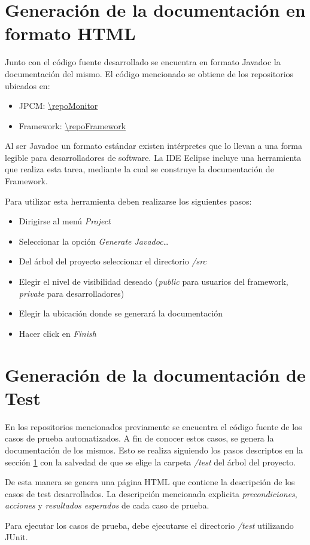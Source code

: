 \section{Generación de la documentación en formato HTML}
\label{genJavadoc}
Junto con el código fuente desarrollado se encuentra en formato Javadoc la
documentación del mismo. El código mencionado se obtiene de los repositorios
ubicados en:
\begin{itemize}
  \item JPCM: \url{\repoMonitor}
  \item \nombreFramework Framework: \url{\repoFramework}
\end{itemize}

 Al ser Javadoc un formato estándar existen intérpretes
que lo llevan a una forma legible para desarrolladores de software.
La IDE Eclipse incluye una herramienta que realiza esta tarea, mediante la cual
se construye la documentación de \nombreFramework Framework.

Para utilizar esta herramienta deben realizarse los siguientes pasos:
\begin{itemize}
  \item Dirigirse al menú \textit{Project}
  \item Seleccionar la opción \textit{Generate Javadoc\ldots}
  \item Del árbol del proyecto seleccionar el directorio \textit{/src}
  \item Elegir el nivel de visibilidad deseado (\textit{public} para usuarios
  del framework, \textit{private} para desarrolladores)
  \item Elegir la ubicación donde se generará la documentación
  \item Hacer click en \textit{Finish}
\end{itemize}

\section{Generación de la documentación de Test}
En los repositorios mencionados previamente se encuentra el código fuente de los
casos de prueba automatizados. A fin de conocer estos casos, se genera la
documentación de los mismos.
Esto se realiza siguiendo los pasos descriptos en la sección \ref{genJavadoc}
con la salvedad de que se elige la carpeta \textit{/test} del árbol del proyecto.

De esta manera se genera una página HTML que contiene la descripción de los casos
de test desarrollados. La descripción mencionada explicita \textit{precondiciones}, \textit{acciones} y
\textit{resultados esperados} de cada caso de prueba.

Para ejecutar los casos de prueba, debe ejecutarse el directorio \textit{/test}
utilizando JUnit.
